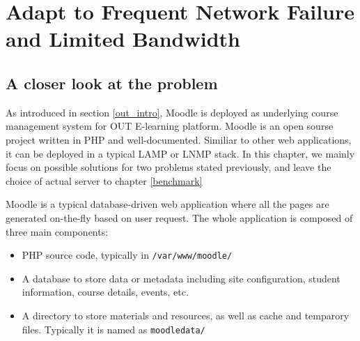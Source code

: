 \chapter{Adapt to Frequent Network Failure and Limited Bandwidth}




\section{A closer look at the problem} \label{components}
As introduced in section \ref{out_intro}, Moodle is deployed as underlying course management system for OUT E-learning platform. Moodle is an open sourse project written in PHP and well-documented\cite{aosamoodle}\cite{moodledoc}. Similiar to other web applications, it can be deployed in a typical LAMP or LNMP stack. In this chapter, we mainly focus on possible solutions for two problems stated previously, and leave the choice of actual server to chapter \ref{benchmark}

Moodle is a typical database-driven web application where all the pages are generated on-the-fly based on user request. The whole application is composed of three main components: 
\begin{itemize}
\item PHP source code, typically in \texttt{/var/www/moodle/}
\item A database to store data or metadata including site configuration, student information, course details, events, etc.
\item A directory to store materials and resources, as well as cache and temparory files. Typically it is named as \texttt{moodledata/}
\end{itemize}

